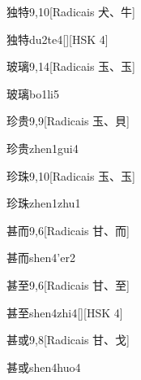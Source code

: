 \begin{entry}{独特}{9,10}[Radicais ⽝、⽜]
  \begin{phonetics}{独特}{du2te4}[][HSK 4]
  \end{phonetics}
\end{entry}

\begin{entry}{玻璃}{9,14}[Radicais ⽟、⽟]
  \begin{phonetics}{玻璃}{bo1li5}
  \end{phonetics}
\end{entry}

\begin{entry}{珍贵}{9,9}[Radicais ⽟、⾙]
  \begin{phonetics}{珍贵}{zhen1gui4}
  \end{phonetics}
\end{entry}

\begin{entry}{珍珠}{9,10}[Radicais ⽟、⽟]
  \begin{phonetics}{珍珠}{zhen1zhu1}
  \end{phonetics}
\end{entry}

\begin{entry}{甚而}{9,6}[Radicais ⽢、⽽]
  \begin{phonetics}{甚而}{shen4'er2}
  \end{phonetics}
\end{entry}

\begin{entry}{甚至}{9,6}[Radicais ⽢、⾄]
  \begin{phonetics}{甚至}{shen4zhi4}[][HSK 4]
  \end{phonetics}
\end{entry}

\begin{entry}{甚或}{9,8}[Radicais ⽢、⼽]
  \begin{phonetics}{甚或}{shen4huo4}
  \end{phonetics}
\end{entry}

